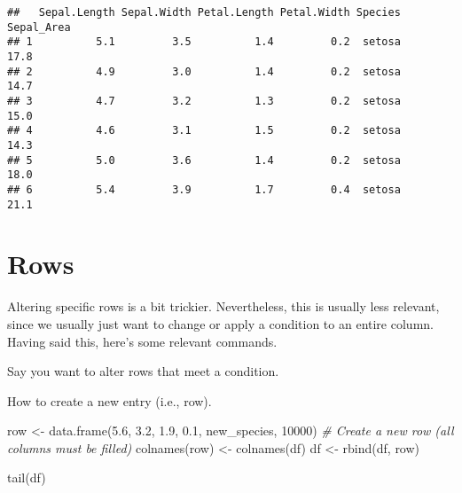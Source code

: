 \documentclass[
]{book}
\newenvironment{Shaded}{\begin{snugshade}}{\end{snugshade}}
\newcommand{\CommentTok}[1]{\textcolor[rgb]{0.56,0.35,0.01}{\textit{#1}}}
\newcommand{\DecValTok}[1]{\textcolor[rgb]{0.00,0.00,0.81}{#1}}
\newcommand{\FloatTok}[1]{\textcolor[rgb]{0.00,0.00,0.81}{#1}}
\newcommand{\FunctionTok}[1]{\textcolor[rgb]{0.00,0.00,0.00}{#1}}
\newcommand{\NormalTok}[1]{#1}
\newcommand{\OtherTok}[1]{\textcolor[rgb]{0.56,0.35,0.01}{#1}}
\newcommand{\SpecialCharTok}[1]{\textcolor[rgb]{0.00,0.00,0.00}{#1}}
\newcommand{\StringTok}[1]{\textcolor[rgb]{0.31,0.60,0.02}{#1}}
\begin{document}
\begin{verbatim}
##   Sepal.Length Sepal.Width Petal.Length Petal.Width Species Sepal_Area
## 1          5.1         3.5          1.4         0.2  setosa       17.8
## 2          4.9         3.0          1.4         0.2  setosa       14.7
## 3          4.7         3.2          1.3         0.2  setosa       15.0
## 4          4.6         3.1          1.5         0.2  setosa       14.3
## 5          5.0         3.6          1.4         0.2  setosa       18.0
## 6          5.4         3.9          1.7         0.4  setosa       21.1
\end{verbatim}

\hypertarget{rows}{%
\section{Rows}\label{rows}}

Altering specific rows is a bit trickier. Nevertheless, this is usually less relevant, since we usually just want to change or apply a condition to an entire column. Having said this, here's some relevant commands.

Say you want to alter rows that meet a condition.

\begin{Shaded}
\end{Shaded}

How to create a new entry (i.e., row).

\begin{Shaded}
\begin{Highlighting}[]
\NormalTok{row }\OtherTok{\textless{}{-}} \FunctionTok{data.frame}\NormalTok{(}\FloatTok{5.6}\NormalTok{, }\FloatTok{3.2}\NormalTok{, }\FloatTok{1.9}\NormalTok{, }\FloatTok{0.1}\NormalTok{, }\StringTok{\textquotesingle{}new\_species\textquotesingle{}}\NormalTok{, }\DecValTok{10000}\NormalTok{)  }\CommentTok{\# Create a new row (all columns must be filled)}
\FunctionTok{colnames}\NormalTok{(row) }\OtherTok{\textless{}{-}} \FunctionTok{colnames}\NormalTok{(df)}
\NormalTok{df }\OtherTok{\textless{}{-}} \FunctionTok{rbind}\NormalTok{(df, row)}

\FunctionTok{tail}\NormalTok{(df)}
\end{Highlighting}
\end{Shaded}
\end{document}
